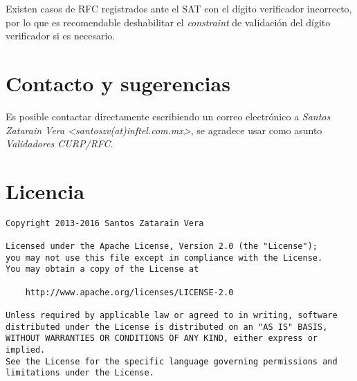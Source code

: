 \documentclass[12pt,letterpaper]{article}
\begin{document}
Existen casos de RFC registrados ante el SAT con el dígito verificador incorrecto, por lo que
es recomendable deshabilitar el \emph{constraint} de validación del dígito verificador si es necesario.

\section{Contacto y sugerencias}

Es posible contactar directamente escribiendo un correo electrónico a
\emph{Santos Zatarain Vera <santoszv(at)inftel.com.mx>}, se agradece usar
como asunto \emph{Validadores CURP/RFC}.

\section{Licencia}

\begin{verbatim}
Copyright 2013-2016 Santos Zatarain Vera

Licensed under the Apache License, Version 2.0 (the "License");
you may not use this file except in compliance with the License.
You may obtain a copy of the License at

    http://www.apache.org/licenses/LICENSE-2.0

Unless required by applicable law or agreed to in writing, software
distributed under the License is distributed on an "AS IS" BASIS,
WITHOUT WARRANTIES OR CONDITIONS OF ANY KIND, either express or implied.
See the License for the specific language governing permissions and
limitations under the License.
\end{verbatim}
\end{document}
